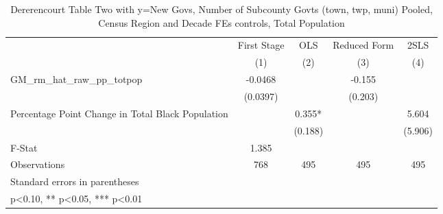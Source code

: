 \begin{table}[htbp]\centering
\def\sym#1{\ifmmode^{#1}\else\(^{#1}\)\fi}
\caption{Dererencourt Table Two with y=New Govs, Number of Subcounty Govts (town, twp, muni)  Pooled, Census Region and Decade FEs controls, Total Population}
\begin{tabular}{l*{4}{c}}
\toprule
                    & First Stage   &         OLS   &Reduced Form   &        2SLS   \\
                    &\multicolumn{1}{c}{(1)}   &\multicolumn{1}{c}{(2)}   &\multicolumn{1}{c}{(3)}   &\multicolumn{1}{c}{(4)}   \\
\midrule
GM\_rm\_hat\_raw\_pp\_totpop&     -0.0468   &               &      -0.155   &               \\
                    &    (0.0397)   &               &     (0.203)   &               \\
\addlinespace
Percentage Point Change in Total Black Population&               &       0.355*  &               &       5.604   \\
                    &               &     (0.188)   &               &     (5.906)   \\
\midrule
F-Stat              &       1.385   &               &               &               \\
Observations        &         768   &         495   &         495   &         495   \\
\bottomrule
\multicolumn{5}{l}{\footnotesize Standard errors in parentheses}\\
\multicolumn{5}{l}{\footnotesize * p<0.10, ** p<0.05, *** p<0.01}\\
\end{tabular}
\end{table}
